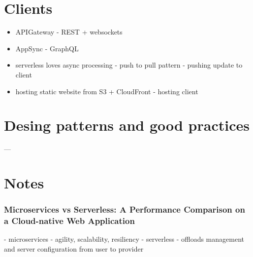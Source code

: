 \section{Clients}

\begin{itemize}
    \item APIGateway - REST + websockets
    \item AppSync - GraphQL
    \item serverless loves async processing - push to pull pattern - pushing update to client
    \item hosting static website from S3 + CloudFront - hosting client
\end{itemize}

\section{Desing patterns and good practices}

---

\section{Notes}




\subsubsection*{Microservices vs Serverless: A Performance Comparison on a Cloud-native Web Application}

- microservices - agility, scalability, resiliency
- serverless - offloads management and server configuration from user to provider

